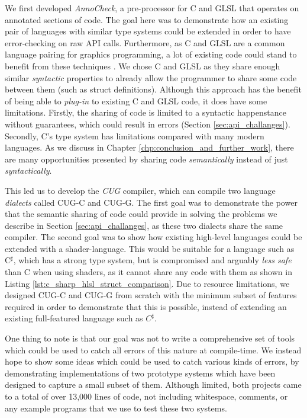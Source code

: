 \documentclass[a4paper,12pt,twoside,openright]{report}
\begin{document}
We first developed \textit{AnnoCheck}, a pre-processor for C and GLSL that
operates on annotated sections of code. The goal here was to demonstrate how an
existing pair of languages with similar type systems could be extended in order
to have error-checking on raw API calls. Furthermore, as C and GLSL are a
common language pairing for graphics programming, a lot of existing code could
stand to benefit from these techniques \cite{TODO}. We chose C and GLSL as they
share enough similar \textit{syntactic} properties to already allow the
programmer to share some code between them (such as struct definitions).
Although this approach has the benefit of being able to \textit{plug-in} to
existing C and GLSL code, it does have some limitations. Firstly, the sharing
of code is limited to a syntactic happenstance without guarantees, which could
result in errors (Section \ref{sec:api_challanges}). Secondly, C's type system
has limitations compared with many modern languages. As we discuss in Chapter
\ref{chp:conclusion_and_further_work}, there are many opportunities presented
by sharing code \textit{semantically} instead of just \textit{syntactically}.


This led us to develop the \textit{CUG} compiler, which can compile two
language \textit{dialects} called CUG-C and CUG-G. The first goal was to
demonstrate the power that the semantic sharing of code could provide in
solving the problems we describe in Section \ref{sec:api_challanges}, as these
two dialects share the same compiler. The second goal was to show how existing
high-level languages could be extended with a shader-language. This would be
suitable for a language such as C$^\sharp$, which has a strong type system, but
is compromised and arguably \textit{less safe} than C when using shaders, as it
cannot share any code with them as shown in Listing
\ref{lst:c_sharp_hlsl_struct_comparison}. Due to resource limitations, we
designed CUG-C and CUG-G from scratch with the minimum subset of features
required in order to demonstrate that this is possible, instead of extending an
existing full-featured language such as $C^\sharp$.

One thing to note is that our goal was not to write a comprehensive set of
tools which could be used to catch all errors of this nature at compile-time.
We instead hope to show some ideas which could be used to catch various kinds
of errors, by demonstrating implementations of two prototype systems which have
been designed to capture a small subset of them. Although limited, both
projects came to a total of over 13,000 lines of code, not including
whitespace, comments, or any example programs that we use to test these two
systems.
\end{document}
